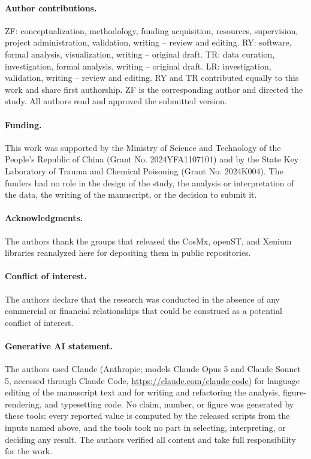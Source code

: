 \paragraph{Author contributions.}
ZF: conceptualization, methodology, funding acquisition, resources, supervision, project
administration, validation, writing -- review and editing. RY: software, formal analysis, visualization,
writing -- original draft. TR: data curation, investigation, formal analysis, writing --
original draft. LR:
investigation, validation, writing -- review and editing. RY and TR contributed equally to
this work and share first authorship. ZF is the corresponding author and directed the study. All authors
read and approved the submitted version.

\paragraph{Funding.}
This work was supported by the Ministry of Science and Technology of the People's Republic
of China (Grant No. 2024YFA1107101) and by the State Key Laboratory of Trauma and
Chemical Poisoning (Grant No. 2024K004). The funders had no role in the design of the
study, the analysis or interpretation of the data, the writing of the manuscript, or the
decision to submit it.

\paragraph{Acknowledgments.}
The authors thank the groups that released the CosMx, openST, and Xenium libraries
reanalyzed here for depositing them in public repositories.

\paragraph{Conflict of interest.}
The authors declare that the research was conducted in the absence of any commercial or
financial relationships that could be construed as a potential conflict of interest.

\paragraph{Generative AI statement.}
The authors used Claude (Anthropic; models Claude Opus 5 and Claude Sonnet 5, accessed through
Claude Code, \url{https://claude.com/claude-code}) for language editing of the manuscript text
and for writing and refactoring the analysis, figure-rendering, and typesetting code. No claim,
number, or figure was generated by these tools: every reported value is computed by the
released scripts from the inputs named above, and the tools took no part in selecting,
interpreting, or deciding any result. The authors verified all content and take full
responsibility for the work.
